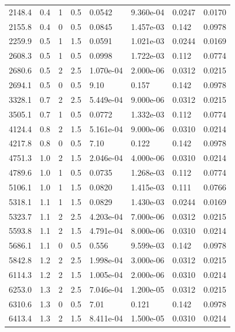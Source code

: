 \documentclass[preview]{standalone}
\begin{document}
{{\begin{tabular}{L{1.2cm}C{1.2cm} C{0.3cm}C{0.5cm} C{1.4cm}C{1.4cm} C{1.4cm}C{1.4cm}}
  2148.4  &   0.4  & 1     & 0.5 &  0.0542  & 9.360e-04  & 0.0247 &  0.0170   \\ 
  2155.8  &   0.4  & 0     & 0.5 &  0.0845  & 1.457e-03  & 0.142 &  0.0978   \\ 
  2259.9  &   0.5  & 1     & 1.5 &  0.0591  & 1.021e-03  & 0.0244 &  0.0169   \\ 
  2608.3  &   0.5  & 1     & 0.5 &  0.0998  & 1.722e-03  & 0.112 &  0.0774   \\ 
  2680.6  &   0.5  & 2     & 2.5 &  1.070e-04  & 2.000e-06  & 0.0312 &  0.0215   \\ 
  2694.1  &   0.5  & 0     & 0.5 &  9.10  & 0.157  & 0.142 &  0.0978   \\ 
  3328.1  &   0.7  & 2     & 2.5 &  5.449e-04  & 9.000e-06  & 0.0312 &  0.0215   \\ 
  3505.1  &   0.7  & 1     & 0.5 &  0.0772  & 1.332e-03  & 0.112 &  0.0774   \\ 
  4124.4  &   0.8  & 2     & 1.5 &  5.161e-04  & 9.000e-06  & 0.0310 &  0.0214   \\ 
  4217.8  &   0.8  & 0     & 0.5 &  7.10  & 0.122  & 0.142 &  0.0978   \\ 
  4751.3  &   1.0  & 2     & 1.5 &  2.046e-04  & 4.000e-06  & 0.0310 &  0.0214   \\ 
  4789.6  &   1.0  & 1     & 0.5 &  0.0735  & 1.268e-03  & 0.112 &  0.0774   \\ 
  5106.1  &   1.0  & 1     & 1.5 &  0.0820  & 1.415e-03  & 0.111 &  0.0766   \\ 
  5318.1  &   1.1  & 1     & 1.5 &  0.0829  & 1.430e-03  & 0.0244 &  0.0169   \\ 
  5323.7  &   1.1  & 2     & 2.5 &  4.203e-04  & 7.000e-06  & 0.0312 &  0.0215   \\ 
  5593.8  &   1.1  & 2     & 1.5 &  4.791e-04  & 8.000e-06  & 0.0310 &  0.0214   \\ 
  5686.1  &   1.1  & 0     & 0.5 &  0.556  & 9.599e-03  & 0.142 &  0.0978   \\ 
  5842.8  &   1.2  & 2     & 2.5 &  1.998e-04  & 3.000e-06  & 0.0312 &  0.0215   \\ 
  6114.3  &   1.2  & 2     & 1.5 &  1.005e-04  & 2.000e-06  & 0.0310 &  0.0214   \\ 
  6253.0  &   1.3  & 2     & 2.5 &  7.046e-04  & 1.200e-05  & 0.0312 &  0.0215   \\ 
  6310.6  &   1.3  & 0     & 0.5 &  7.01  & 0.121  & 0.142 &  0.0978   \\ 
  6413.4  &   1.3  & 2     & 1.5 &  8.411e-04  & 1.500e-05  & 0.0310 &  0.0214   \\ 

\end{tabular}}}
\end{document}
